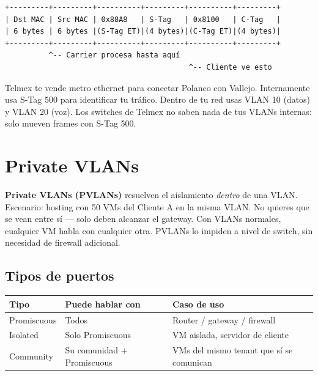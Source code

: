 \begin{lstlisting}
+---------+---------+----------+---------+----------+---------+
| Dst MAC | Src MAC | 0x88A8   | S-Tag   | 0x8100   | C-Tag   |
| 6 bytes | 6 bytes |(S-Tag ET)|(4 bytes)|(C-Tag ET)|(4 bytes)|
+---------+---------+----------+---------+----------+---------+
          ^-- Carrier procesa hasta aquí
                                          ^-- Cliente ve esto
\end{lstlisting}

\begin{ejemplo}
Telmex te vende metro ethernet para conectar Polanco con Vallejo. Internamente usa S-Tag
500 para identificar tu tráfico. Dentro de tu red usas VLAN 10 (datos) y VLAN 20 (voz).
Los switches de Telmex no saben nada de tus VLANs internas: solo mueven frames con S-Tag 500.
\end{ejemplo}

\section{ Private VLANs}

\begin{concepto}
\textbf{Private VLANs (PVLANs)} resuelven el aislamiento \emph{dentro} de una VLAN.
Escenario: hosting con 50 VMs del Cliente A en la misma VLAN. No quieres que se vean
entre sí — solo deben alcanzar el gateway. Con VLANs normales, cualquier VM habla con
cualquier otra. PVLANs lo impiden a nivel de switch, sin necesidad de firewall adicional.
\end{concepto}

\subsection{Tipos de puertos}

\begin{center}
\begin{tabular}{lll}
\toprule
\textbf{Tipo} & \textbf{Puede hablar con} & \textbf{Caso de uso} \\
\midrule
Promiscuous  & Todos                        & Router / gateway / firewall \\
Isolated     & Solo Promiscuous             & VM aislada, servidor de cliente \\
Community    & Su comunidad + Promiscuous   & VMs del mismo tenant que sí se comunican \\
\bottomrule
\end{tabular}
\end{center}

